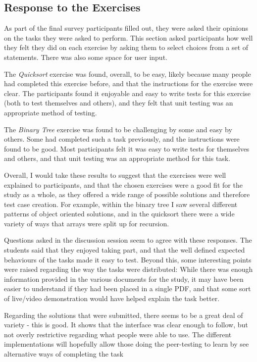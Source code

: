 \documentclass[a4paper,11pt]{report}
\begin{document}
\subsection{Response to the Exercises}
As part of the final survey participants filled out, they were asked their opinions on the tasks they were asked to perform. This section asked participants how well they felt they did on each exercise by asking them to select choices from a set of statements. There was also some space for user input.\par
The \textit{Quicksort} exercise was found, overall, to be easy, likely because many people had completed this exercise before, and that the instructions for the exercise were clear. The participants found it enjoyable and easy to write tests for this exercise (both to test themselves and others), and they felt that unit testing was an appropriate method of testing.\par
The \textit{Binary Tree} exercise was found to be challenging by some and easy by others. Some had completed such a task previously, and the instructions were found to be good. Most participants felt it was easy to write tests for themselves and others, and that unit testing was an appropriate method for this task.\par
Overall, I would take these results to suggest that the exercises were well explained to participants, and that the chosen exercises were a good fit for the study as a whole, as they offered a wide range of possible solutions and therefore test case creation. For example, within the binary tree I saw several different patterns of object oriented solutions, and in the quicksort there were a wide variety of ways that arrays were split up for recursion.\par
Questions asked in the discussion session seem to agree with these responses. The students said that they enjoyed taking part, and that the well defined expected behaviours of the tasks made it easy to test. Beyond this, some interesting points were raised regarding the way the tasks were distributed: While there was enough information provided in the various documents for the study, it may have been easier to understand if they had been placed in a single PDF, and that some sort of live/video demonstration would have helped explain the task better.\par
Regarding the solutions that were submitted, there seems to be a great deal of variety - this is good. It shows that the interface was clear enough to follow, but not overly restrictive regarding what people were able to use. The different implementations will hopefully allow those doing the peer-testing to learn by see alternative ways of completing the task\par
\end{document}

